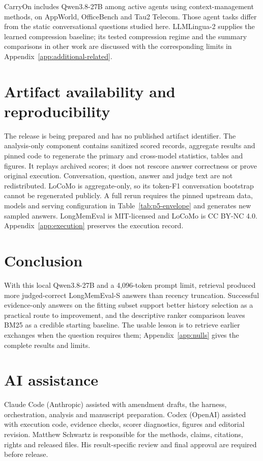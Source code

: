\documentclass[11pt,letterpaper]{article}
\newcommand{\PfiveLargeBudget}{4,096}
\begin{document}
CarryOn \citep{li2026carryon} includes Qwen3.8-27B among active agents using
context-management methods, on AppWorld, OfficeBench and Tau2 Telecom. Those
agent tasks differ from the static conversational questions studied here.
LLMLingua-2 \citep{pan2024llmlingua2} supplies the learned compression baseline;
its tested compression regime and the summary comparisons in other work are
discussed with the corresponding limits in Appendix~\ref{app:additional-related}.

\section{Artifact availability and reproducibility}
\label{sec:artifacts}
The release is being prepared and has no published artifact identifier.
The analysis-only component contains sanitized scored records, aggregate
results and pinned code to regenerate the primary and cross-model statistics,
tables and figures. It replays archived scores; it does not rescore answer
correctness or prove original execution. Conversation, question, answer and
judge text are not redistributed. LoCoMo is aggregate-only, so its token-F1
conversation bootstrap cannot be regenerated publicly. A full rerun requires
the pinned upstream data, models and serving configuration in
Table~\ref{tab:p5-envelope} and generates new sampled answers. LongMemEval is
MIT-licensed and LoCoMo is CC BY-NC 4.0. Appendix~\ref{app:execution} preserves
the execution record.

\section{Conclusion}
\label{sec:conclusion}
With this local Qwen3.8-27B and a \PfiveLargeBudget{}-token prompt limit, retrieval
produced more judged-correct LongMemEval-S answers than recency truncation. Successful evidence-only answers on the fitting subset support
better history selection as a practical route to improvement, and the
descriptive ranker comparison leaves BM25 as a credible starting baseline.
The usable lesson is to retrieve earlier exchanges when the question requires
them; Appendix~\ref{app:nulls} gives the complete results and limits.

\section*{AI assistance}
Claude Code (Anthropic) assisted with amendment drafts, the harness,
orchestration, analysis and manuscript preparation. Codex (OpenAI) assisted with
execution code, evidence checks, scorer diagnostics, figures and editorial
revision. Matthew Schwartz is responsible for the methods, claims, citations,
rights and released files. His result-specific review and final approval are
required before release.
\end{document}
